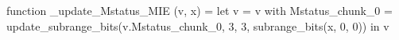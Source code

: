 function _update_Mstatus_MIE (v, x) = let v = { v with Mstatus_chunk_0 = update_subrange_bits(v.Mstatus_chunk_0, 3, 3, subrange_bits(x, 0, 0)) } in
  v
